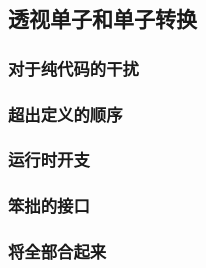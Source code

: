\documentclass[./main.tex]{subfiles}
\begin{document}
\begin{lstlisting}[language=Haskell]

\end{lstlisting}



\begin{lstlisting}[language=Haskell]

\end{lstlisting}



\begin{lstlisting}[language=Haskell]

\end{lstlisting}



\begin{lstlisting}[language=Haskell]

\end{lstlisting}



\subsection*{透视单子和单子转换}

\subsubsection*{对于纯代码的干扰}

\subsubsection*{超出定义的顺序}

\subsubsection*{运行时开支}

\subsubsection*{笨拙的接口}

\subsubsection*{将全部合起来}
\end{document}
